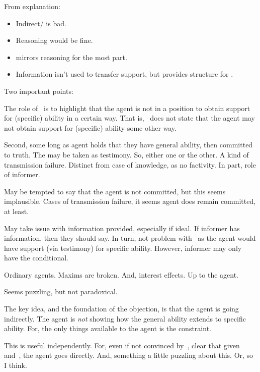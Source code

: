 \begin{note}[Overview]
  From explanation:
  \begin{itemize}
  \item Indirect/\AR{} is bad.
  \item Reasoning would be fine.
  \item \WR{} mirrors reasoning for the most part.
  \item Information isn't used to transfer support, but provides structure for \WR{}.
  \end{itemize}
  
\end{note}

\begin{note}
  Two important points:

  The role of~\nI{} is to highlight that the agent is not in a position to obtain support for (specific) ability in a certain way.
  That is,~\nI{} does not state that the agent may not obtain support for (specific) ability some other way.

  Second, some long as agent holds that they have general ability, then committed to truth.
  The \gen{} may be taken as testimony.
  So, either one or the other.
  A kind of transmission failure.
  Distinct from case of knowledge, as no factivity.
  In part, role of informer.

  May be tempted to say that the agent is not committed, but this seems implausible.
  Cases of transmission failure, it seems agent does remain committed, at least.

  May take issue with information provided, especially if ideal.
  If informer has information, then they should say.
  In turn, not problem with~\nI{} as the agent would have support (via testimony) for specific ability.
  However, informer may only have the conditional.

  Ordinary agents.
  Maxims are broken.
  And, interest effects.
  Up to the agent.

  Seems puzzling, but not paradoxical.
\end{note}

\begin{note}
  The key idea, and the foundation of the objection, is that the agent is going indirectly.
  The agent is \emph{not} showing how the general ability extends to specific ability.
  For, the only things available to the agent is the constraint.

  This is useful independently.
  For, even if not convinced by~\nI{}, clear that given \gsi{} and~\uRa{}, the agent goes directly.
  And, something a little puzzling about this.
  Or, so I think.
\end{note}

